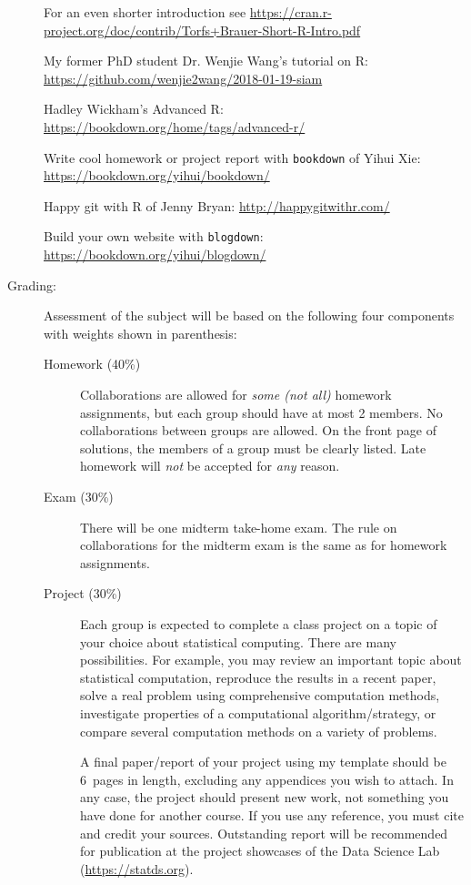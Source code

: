 \documentclass[11pt, twocolumn]{article}
\begin{document}
\begin{description}
For an even shorter introduction see
\url{https://cran.r-project.org/doc/contrib/Torfs+Brauer-Short-R-Intro.pdf}

My former PhD student Dr. Wenjie Wang's tutorial on R:
\url{https://github.com/wenjie2wang/2018-01-19-siam}

Hadley Wickham's Advanced R:
\url{https://bookdown.org/home/tags/advanced-r/}
  
Write cool homework or project report with \texttt{bookdown} of Yihui Xie:
\url{https://bookdown.org/yihui/bookdown/}


Happy git with R of Jenny Bryan:
\url{http://happygitwithr.com/}

Build your own website with \texttt{blogdown}:
\url{https://bookdown.org/yihui/blogdown/}


\item[Grading:] Assessment of the subject will be based on 
the following four components with weights shown in parenthesis:

\begin{description}
\item[Homework (40\%)]
Collaborations are allowed for \emph{some (not all)}
homework assignments, but each group
should have at most 2 members. No collaborations between groups are
allowed. On the front page of solutions, the members of a group must be
clearly listed. Late homework will \emph{not} be accepted for \emph{any}
reason. 

\item[Exam (30\%)]
There will be one midterm take-home exam. The rule on collaborations for the
midterm exam is the same as for homework assignments.

\item[Project (30\%)]
Each group is expected to complete a class project on a topic of your choice
about statistical computing. There are many possibilities. For example, you
may review an important topic about statistical computation,
reproduce the results in a recent paper, solve a
real problem using comprehensive computation methods, investigate
properties of a computational algorithm/strategy, or compare several
computation methods on a variety of problems.

A final paper/report of your project using my template should be 6~pages in
length, excluding any appendices you wish to attach. In any case, the project
should present new work, not something you have done for another course.
If you use any reference, you must cite and credit your sources.
Outstanding report will be recommended for publication at the project showcases
of the Data Science Lab (\url{https://statds.org}).


\end{description}
\end{description}
\end{document}
